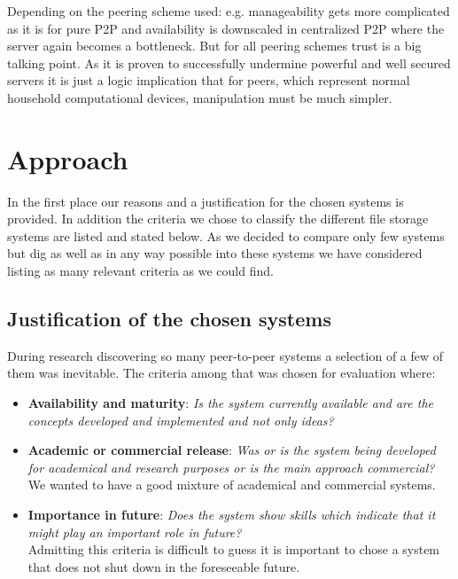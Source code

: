 Depending on the peering scheme used: e.g. manageability gets more complicated as it is for pure P2P and availability is downscaled in centralized P2P where the server again becomes a bottleneck. But for all peering schemes trust is a big talking point. As it is proven to successfully undermine powerful and well secured servers it is just a logic implication that for peers, which represent normal household computational devices, manipulation must be much simpler.

\section{Approach} %
\label{sec:approach}
In the first place our reasons and a justification for the chosen systems is provided. 
In addition the criteria we chose to classify the different file storage systems are listed and stated below. As we decided to compare only few systems but dig as well as in any way possible into these systems we have considered listing as many relevant criteria as we could find.

\subsection{Justification of the chosen systems}
During research discovering so many peer-to-peer systems a selection of a few of them was inevitable. The criteria among that was chosen for evaluation where:
\begin{itemize}
\item \textbf{Availability and maturity}: \textit{Is the system currently available and are the concepts developed and implemented and not only ideas?}\\

\item \textbf{Academic or commercial release}: \textit{Was or is the system being developed for academical and research purposes or is the main approach commercial?}\\
We wanted to have a good mixture of academical and commercial systems.

\item \textbf{Importance in future}: \textit{Does the system show skills which indicate that it might play an important role in future?}\\
Admitting this criteria is difficult to guess it is important to chose a system that does not shut down in the foreseeable future.
\end{itemize}

